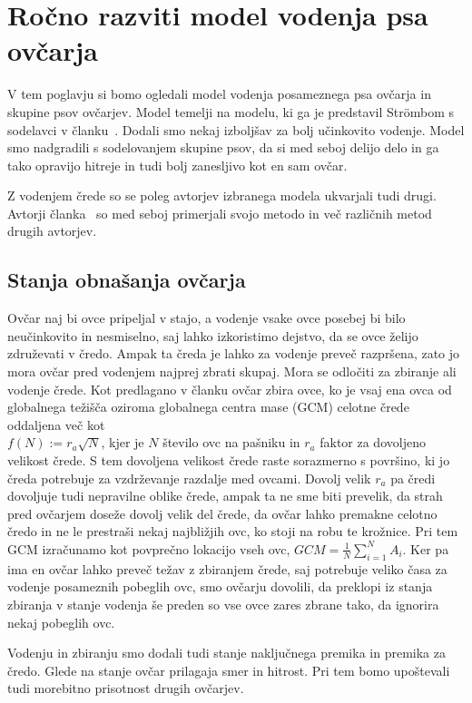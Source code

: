 \section{Ročno razviti model vodenja psa ovčarja}

V tem poglavju si bomo ogledali model vodenja posameznega psa ovčarja in skupine psov ovčarjev. Model temelji na modelu, ki ga je predstavil Str{\"o}mbom s sodelavci v članku~\cite{Stroembom}. Dodali smo nekaj izboljšav za bolj učinkovito vodenje. Model smo nadgradili s sodelovanjem skupine psov, da si med seboj delijo delo in ga tako opravijo hitreje in tudi bolj zanesljivo kot en sam ovčar.

Z vodenjem črede so se poleg avtorjev izbranega modela ukvarjali tudi drugi. Avtorji članka~\cite{comparative} so med seboj primerjali svojo metodo in več različnih metod drugih avtorjev.

\subsection{Stanja obnašanja ovčarja}

Ovčar naj bi ovce pripeljal v stajo, a vodenje vsake ovce posebej bi bilo neučinkovito in nesmiselno, saj lahko izkoristimo dejstvo, da se ovce želijo združevati v čredo. Ampak ta čreda je lahko za vodenje preveč razpršena, zato jo mora ovčar pred vodenjem najprej zbrati skupaj. Mora se odločiti za zbiranje ali vodenje črede. Kot predlagano v članku ovčar zbira ovce, ko je vsaj ena ovca od globalnega težišča oziroma globalnega centra mase (GCM) celotne črede oddaljena več kot\\ $f(N) := r_a\sqrt{N}$, kjer je $N$ število ovc na pašniku in $r_a$ faktor za dovoljeno velikost črede. S tem dovoljena velikost črede raste sorazmerno s površino, ki jo čreda potrebuje za vzdrževanje razdalje med ovcami. Dovolj velik $r_a$ pa čredi dovoljuje tudi nepravilne oblike črede, ampak ta ne sme biti prevelik, da strah pred ovčarjem doseže dovolj velik del črede, da ovčar lahko premakne celotno čredo in ne le prestraši nekaj najbližjih ovc, ko stoji na robu te krožnice. Pri tem GCM izračunamo kot povprečno lokacijo vseh ovc, $GCM = \frac{1}{N}\sum_{i=1}^N A_i$. Ker pa ima en ovčar lahko preveč težav z zbiranjem črede, saj potrebuje veliko časa za vodenje posameznih pobeglih ovc, smo ovčarju dovolili, da preklopi iz stanja zbiranja v stanje vodenja še preden so vse ovce zares zbrane tako, da ignorira nekaj pobeglih ovc.

Vodenju in zbiranju smo dodali tudi stanje naključnega premika in premika za čredo. Glede na stanje ovčar prilagaja smer in hitrost. Pri tem bomo upoštevali tudi morebitno prisotnost drugih ovčarjev.

